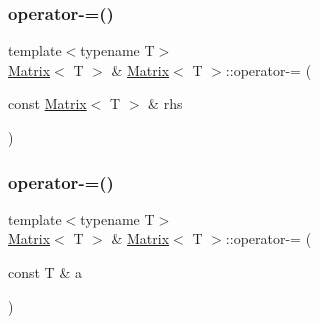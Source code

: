 \mbox{\label{classMatrix_a50e2998bc90012d77efc0ff39d089336_a50e2998bc90012d77efc0ff39d089336}} 
\subsubsection{\texorpdfstring{operator-\/=()}{operator-=()}\hspace{0.1cm}{\footnotesize\ttfamily [1/2]}}
{\footnotesize\ttfamily template$<$typename T$>$ \\
\mbox{\hyperlink{classMatrix}{Matrix}}$<$ T $>$ \& \mbox{\hyperlink{classMatrix}{Matrix}}$<$ T $>$\+::operator-\/= (\begin{DoxyParamCaption}\item[{const \mbox{\hyperlink{classMatrix}{Matrix}}$<$ T $>$ \&}]{rhs }\end{DoxyParamCaption})\hspace{0.3cm}{\ttfamily [inline]}}

\mbox{\label{classMatrix_a8776d41fcbbc1fc08425492576cf6786_a8776d41fcbbc1fc08425492576cf6786}} 
\subsubsection{\texorpdfstring{operator-\/=()}{operator-=()}\hspace{0.1cm}{\footnotesize\ttfamily [2/2]}}
{\footnotesize\ttfamily template$<$typename T$>$ \\
\mbox{\hyperlink{classMatrix}{Matrix}}$<$ T $>$ \& \mbox{\hyperlink{classMatrix}{Matrix}}$<$ T $>$\+::operator-\/= (\begin{DoxyParamCaption}\item[{const T \&}]{a }\end{DoxyParamCaption})\hspace{0.3cm}{\ttfamily [inline]}}

\mbox{\label{classMatrix_aab1b305350c7547ee31f0eeb92fc8c4a_aab1b305350c7547ee31f0eeb92fc8c4a}} 
